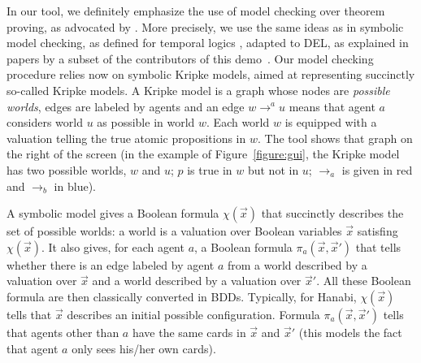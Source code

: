 In our tool, we definitely emphasize the use of model checking over theorem proving, as advocated by \citet{DBLP:conf/kr/HalpernV91}. More precisely, we use the same ideas as in symbolic model checking, as defined for temporal logics \cite{DBLP:conf/lics/BurchCMDH90}, adapted to DEL, as explained in papers by a subset of the contributors of this demo~\cite{DBLP:conf/atal/CharrierS17,DBLP:conf/aiml/CharrierS18}. Our model checking procedure relies now on symbolic Kripke models, aimed at representing succinctly so-called Kripke models. A Kripke model is a graph whose nodes are \emph{possible worlds}, edges are labeled by agents and an edge $w \rightarrow^a u$ means that agent $a$ considers world $u$ as possible in world $w$. Each world $w$ is equipped with a valuation telling the true atomic propositions in $w$. 
The tool shows that graph on the right of the screen (in the example of Figure~\ref{figure:gui}, the Kripke model has two possible worlds, $w$ and $u$; $p$ is true in $w$ but not in $u$; $\rightarrow_a$ is given in red and $\rightarrow_b$ in blue). 


\newcommand{\succinctsetworlds}{\chi}
\newcommand{\succinctrelation}[1]{\pi_{#1}}
 A symbolic model gives a Boolean formula $\succinctsetworlds(\vec x)$ that succinctly  describes the set of possible worlds: a world is a valuation over Boolean variables $\vec x$ satisfing $\succinctsetworlds(\vec x)$. It also gives, for each agent $a$, a Boolean formula $\succinctrelation a(\vec x, \vec x')$ that tells whether there is an edge labeled by agent $a$ from a world described by a valuation over $\vec x$ and  a world described by a valuation over $\vec x'$. All these Boolean formula are then classically converted in BDDs. %
%
%
Typically, for Hanabi, $\succinctsetworlds(\vec x)$ tells that $\vec x$ describes an initial possible configuration. Formula $\succinctrelation a(\vec x, \vec x')$ tells that agents other than $a$ have the same cards in $\vec x$ and $\vec x'$ (this models the fact that agent $a$ only sees his/her own cards).

